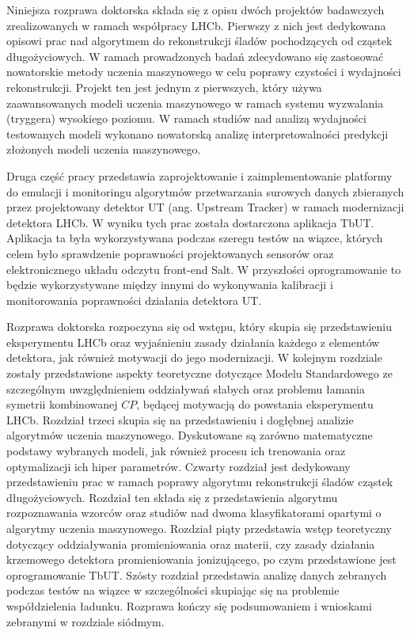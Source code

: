
Niniejsza rozprawa doktorska składa się z opisu dwóch projektów badawczych zrealizowanych w ramach współpracy LHCb. Pierwszy z nich jest dedykowana opisowi prac nad algorytmem do rekonstrukcji śladów pochodzących od cząstek długożyciowych. W ramach prowadzonych badań zdecydowano się zastosować nowatorskie metody uczenia maszynowego w celu poprawy czystości i wydajności rekonstrukcji. Projekt ten jest jednym z pierwszych, który używa zaawansowanych modeli uczenia maszynowego w ramach systemu wyzwalania (tryggera) wysokiego poziomu. W ramach studiów nad analizą wydajności testowanych modeli wykonano nowatorską analizę interpretowalności predykcji złożonych modeli uczenia maszynowego. 

 Druga część pracy przedstawia zaprojektowanie i zaimplementowanie platformy do emulacji i monitoringu algorytmów przetwarzania surowych danych zbieranych przez projektowany detektor UT (ang. Upstream Tracker) w ramach modernizacji detektora LHCb. W wyniku tych prac została dostarczona aplikacja TbUT. Aplikacja ta była wykorzystywana podczas szeregu testów na wiązce, których celem było sprawdzenie poprawności projektowanych sensorów oraz elektronicznego układu odczytu front-end Salt. W przyszłości oprogramowanie to będzie wykorzystywane między innymi do wykonywania kalibracji i monitorowania poprawności działania detektora UT.  


Rozprawa doktorska rozpoczyna się od wstępu, który skupia się przedstawieniu eksperymentu LHCb oraz wyjaśnieniu zasady działania każdego z elementów detektora, jak również motywacji do jego modernizacji. W kolejnym rozdziale zostały przedstawione aspekty teoretyczne dotyczące Modelu Standardowego ze szczególnym uwzględnieniem oddziaływań słabych oraz problemu łamania symetrii kombinowanej $CP$, będącej motywacją do powstania eksperymentu LHCb. Rozdział trzeci skupia się na przedstawieniu i dogłębnej analizie algorytmów uczenia maszynowego. Dyskutowane są zarówno matematyczne podstawy wybranych modeli, jak również procesu ich trenowania oraz optymalizacji ich hiper parametrów. Czwarty rozdział jest dedykowany przedstawieniu prac w ramach poprawy algorytmu rekonstrukcji śladów cząstek długożyciowych. Rozdział ten składa się z przedstawienia algorytmu rozpoznawania wzorców oraz studiów nad dwoma klasyfikatorami opartymi o algorytmy uczenia maszynowego. Rozdział piąty przedstawia wstęp teoretyczny dotyczący oddziaływania promieniowania oraz materii, czy zasady działania krzemowego detektora promieniowania jonizującego, po czym przedstawione jest oprogramowanie TbUT. Szósty rozdział przedstawia analizę danych zebranych podczas testów na wiązce w szczególności skupiając się na problemie współdzielenia ładunku. Rozprawa kończy się  podsumowaniem i wnioskami zebranymi w rozdziale siódmym. 

